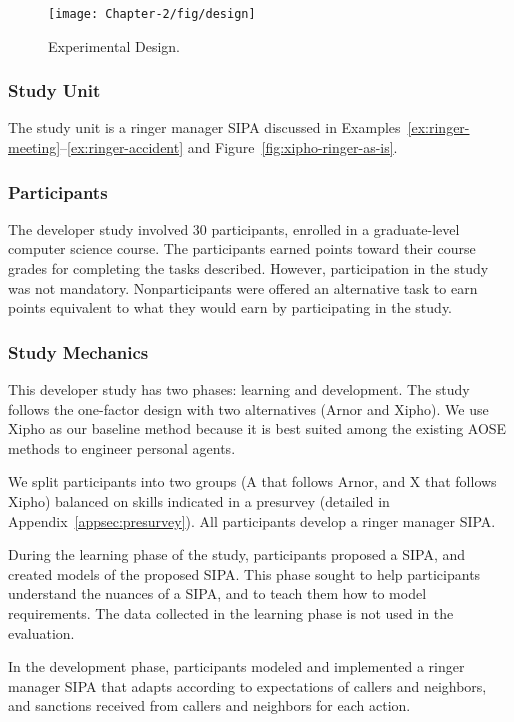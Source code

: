 \documentclass[11pt,          %
               phd,           %
               onehalfspacing %
               ]{ncsuthesis}
\newcommand{\frameworkA}{Arnor\xspace}
\begin{document}
\begin{figure}[!htb] \centering
\texttt{[image: Chapter-2/fig/design]}
\caption{Experimental Design.}
\label{fig:design} \end{figure}

\subsubsection*{Study Unit} 

The study unit is a ringer manager SIPA discussed 
in Examples~\ref{ex:ringer-meeting}--\ref{ex:ringer-accident} and Figure~\ref{fig:xipho-ringer-as-is}.

\subsubsection*{Participants}

The developer study involved 30 participants, enrolled in a
graduate-level computer science course. The participants earned points
toward their course grades for completing the tasks described. However,
participation in the study was not mandatory. Nonparticipants were
offered an alternative task to earn points equivalent to what they would
earn by participating in the study.

\subsubsection*{Study Mechanics}

This developer study has two phases: learning and development.  The study 
follows the one-factor design with two alternatives (\frameworkA and Xipho).  
We use Xipho as our baseline method because it is best suited among the
existing AOSE methods to engineer personal agents.

We split participants into two groups (A that follows \frameworkA, and X
that follows Xipho) balanced on skills indicated in a presurvey
(detailed in Appendix~\ref{appsec:presurvey}). All participants develop
a ringer manager SIPA.

\begin{description}[leftmargin=1em]

\item[Learning Phase.] During the learning phase of the study,
participants proposed a SIPA, and created models of the proposed SIPA.
This phase sought to help participants understand the nuances of a SIPA,
and to teach them how to model requirements. The data collected in the
learning phase is not used in the evaluation. 

\item[Development Phase.] In the development phase, participants
modeled and implemented a ringer manager SIPA that adapts according
to expectations of callers and 
neighbors, and sanctions received from callers and
neighbors for each action.

\end{description}
\end{document}
